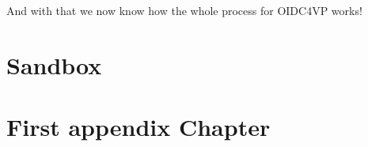\documentclass[
	a4paper               %
	,bibliography=totoc   %
	,listof=totoc         %
	,monolingual
]{bfhthesis}              %
\begin{document}
And with that we now know how the whole process for OIDC4VP works!


\chapter{Sandbox}

\appendix


\chapter{First appendix Chapter}



\end{document}
